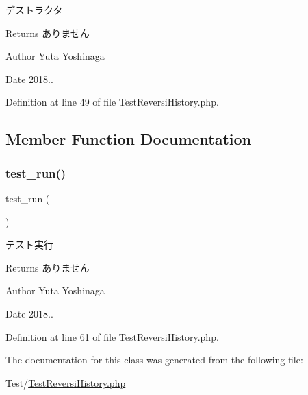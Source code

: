 デストラクタ 

\begin{DoxyReturn}{Returns}
ありません 
\end{DoxyReturn}
\begin{DoxyAuthor}{Author}
Yuta Yoshinaga 
\end{DoxyAuthor}
\begin{DoxyDate}{Date}
2018.. 
\end{DoxyDate}


Definition at line 49 of file Test\+Reversi\+History.\+php.



\subsection{Member Function Documentation}
\mbox{\label{class_test_reversi_history_a9b029832cfdf19c0ef36b1f5ef7b7735}} 
\subsubsection{\texorpdfstring{test\+\_\+run()}{test\_run()}}
{\footnotesize\ttfamily test\+\_\+run (\begin{DoxyParamCaption}{ }\end{DoxyParamCaption})}



テスト実行 

\begin{DoxyReturn}{Returns}
ありません 
\end{DoxyReturn}
\begin{DoxyAuthor}{Author}
Yuta Yoshinaga 
\end{DoxyAuthor}
\begin{DoxyDate}{Date}
2018.. 
\end{DoxyDate}


Definition at line 61 of file Test\+Reversi\+History.\+php.



The documentation for this class was generated from the following file\+:\begin{DoxyCompactItemize}
\item 
Test/\hyperlink{_test_reversi_history_8php}{Test\+Reversi\+History.\+php}\end{DoxyCompactItemize}
